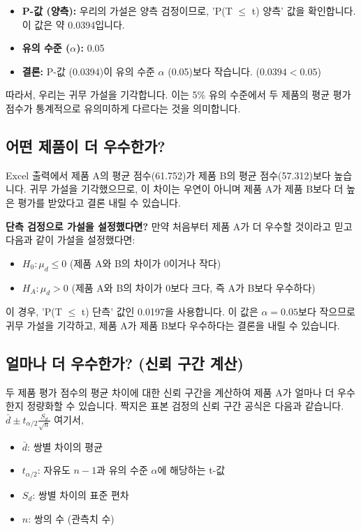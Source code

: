 \documentclass[11pt,a4paper]{article}
\begin{document}
\begin{itemize}
    \item \textbf{P-값 (양측):} 우리의 가설은 양측 검정이므로, 'P(T $\le$ t) 양측' 값을 확인합니다. 이 값은 약 0.0394입니다.
    \item \textbf{유의 수준 ($\alpha$):} 0.05
    \item \textbf{결론:} P-값 (0.0394)이 유의 수준 $\alpha$ (0.05)보다 작습니다. ($0.0394 < 0.05$)
\end{itemize}
따라서, 우리는 귀무 가설을 기각합니다. 이는 5\% 유의 수준에서 두 제품의 평균 평가 점수가 통계적으로 유의미하게 다르다는 것을 의미합니다.

\subsection*{어떤 제품이 더 우수한가?}
Excel 출력에서 제품 A의 평균 점수(61.752)가 제품 B의 평균 점수(57.312)보다 높습니다. 귀무 가설을 기각했으므로, 이 차이는 우연이 아니며 제품 A가 제품 B보다 더 높은 평가를 받았다고 결론 내릴 수 있습니다.

\begin{examplebox}
\textbf{단측 검정으로 가설을 설정했다면?}
만약 처음부터 제품 A가 더 우수할 것이라고 믿고 다음과 같이 가설을 설정했다면:
\begin{itemize}
    \item $H_0: \mu_d \le 0$ (제품 A와 B의 차이가 0이거나 작다)
    \item $H_A: \mu_d > 0$ (제품 A와 B의 차이가 0보다 크다, 즉 A가 B보다 우수하다)
\end{itemize}
이 경우, 'P(T $\le$ t) 단측' 값인 0.0197을 사용합니다. 이 값은 $\alpha=0.05$보다 작으므로 귀무 가설을 기각하고, 제품 A가 제품 B보다 우수하다는 결론을 내릴 수 있습니다.
\end{examplebox}

\subsection*{얼마나 더 우수한가? (신뢰 구간 계산)}
두 제품 평가 점수의 평균 차이에 대한 신뢰 구간을 계산하여 제품 A가 얼마나 더 우수한지 정량화할 수 있습니다. 짝지은 표본 검정의 신뢰 구간 공식은 다음과 같습니다.
$\bar{d} \pm t_{\alpha/2} \frac{S_d}{\sqrt{n}}$
여기서,
\begin{itemize}
    \item $\bar{d}$: 쌍별 차이의 평균
    \item $t_{\alpha/2}$: 자유도 $n-1$과 유의 수준 $\alpha$에 해당하는 t-값
    \item $S_d$: 쌍별 차이의 표준 편차
    \item $n$: 쌍의 수 (관측치 수)
\end{itemize}
\end{document}
